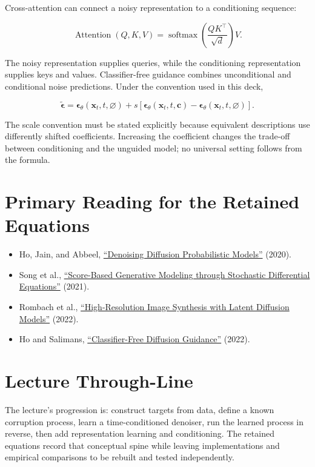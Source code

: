 \documentclass{article}
\begin{document}
Cross-attention can connect a noisy representation to a conditioning sequence:

\[
\operatorname{Attention}(Q,K,V)
=\operatorname{softmax}\!\left(\frac{QK^{\top}}{\sqrt d}\right)V.
\]

The noisy representation supplies queries, while the conditioning representation
supplies keys and values. Classifier-free guidance combines unconditional and
conditional noise predictions. Under the convention used in this deck,

\[
\tilde{\boldsymbol{\epsilon}}
=\boldsymbol{\epsilon}_{\theta}(\mathbf{x}_t,t,\varnothing)
+s\left[
\boldsymbol{\epsilon}_{\theta}(\mathbf{x}_t,t,\mathbf{c})
-\boldsymbol{\epsilon}_{\theta}(\mathbf{x}_t,t,\varnothing)
\right].
\]

The scale convention must be stated explicitly because equivalent descriptions use
differently shifted coefficients. Increasing the coefficient changes the trade-off
between conditioning and the unguided model; no universal setting follows from the
formula.


\section{Primary Reading for the Retained Equations}

\begin{itemize}
\item Ho, Jain, and Abbeel,
\href{https://arxiv.org/abs/2006.11239}
{``Denoising Diffusion Probabilistic Models''} (2020).
\item Song et al.,
\href{https://openreview.net/forum?id=PxTIG12RRHS}
{``Score-Based Generative Modeling through Stochastic Differential Equations''}
(2021).
\item Rombach et al.,
\href{https://openaccess.thecvf.com/content/CVPR2022/html/Rombach_High-Resolution_Image_Synthesis_With_Latent_Diffusion_Models_CVPR_2022_paper.html}
{``High-Resolution Image Synthesis with Latent Diffusion Models''} (2022).
\item Ho and Salimans,
\href{https://arxiv.org/abs/2207.12598}
{``Classifier-Free Diffusion Guidance''} (2022).
\end{itemize}

\section{Lecture Through-Line}

The lecture's progression is: construct targets from data, define a known corruption
process, learn a time-conditioned denoiser, run the learned process in reverse, then
add representation learning and conditioning. The retained equations record that
conceptual spine while leaving implementations and empirical comparisons to be rebuilt
and tested independently.
\end{document}

